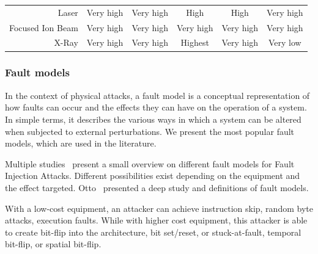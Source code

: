 \begin{table}[ht]
\begin{tabular}{@{}rccccc@{}}
        Laser              & Very high                                                                                        & Very high                                                         & High          & High               & Very high                                                      \\
        Focused Ion Beam   & Very high                                                                                        & Very high                                                         & Very high     & Very high          & Very high                                                      \\
        X-Ray              & Very high                                                                                        & Very high                                                         & Highest       & Very high          & Very low                                                       \\
        \bottomrule
    \end{tabular}
\end{table}

\subsubsection{Fault models}
\label{section:soa_fm}
In the context of physical attacks, a fault model is a conceptual representation of how faults can occur and the effects they can have on the operation of a system. In simple terms, it describes the various ways in which a system can be altered when subjected to external perturbations.
We present the most popular fault models, which are used in the literature.

Multiple studies~\cite{BH-22-access,GMA-22-electronics,KSV-13-tvlsi,ZAV-06-jarab,YSW-18-hss} present a small overview on different fault models for Fault Injection Attacks. Different possibilities exist depending on the equipment and the effect targeted. Otto~\cite{O-05-phd} presented a deep study and definitions of fault models.

With a low-cost equipment, an attacker can achieve instruction skip, random byte attacks, execution faults. While with higher cost equipment, this attacker is able to create bit-flip into the architecture, bit set/reset, or stuck-at-fault, temporal bit-flip, or spatial bit-flip.

